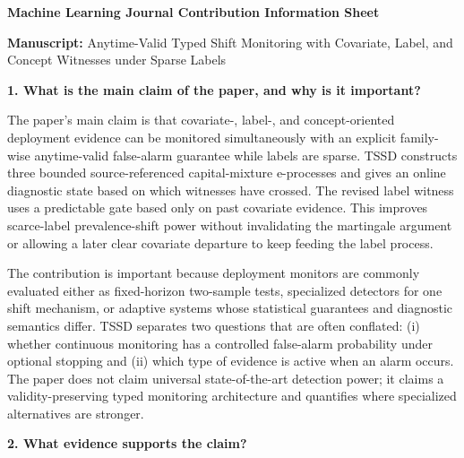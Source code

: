 \documentclass[11pt,a4paper]{article}
\begin{document}
\begin{center}
{\Large\bfseries Machine Learning Journal Contribution Information Sheet}\par
\vspace{0.35em}
{\bfseries Manuscript:} Anytime-Valid Typed Shift Monitoring with Covariate, Label, and Concept Witnesses under Sparse Labels
\end{center}

\textbf{1. What is the main claim of the paper, and why is it important?}

The paper's main claim is that covariate-, label-, and concept-oriented deployment evidence can be monitored simultaneously with an explicit family-wise anytime-valid false-alarm guarantee while labels are sparse. TSSD constructs three bounded source-referenced capital-mixture e-processes and gives an online diagnostic state based on which witnesses have crossed. The revised label witness uses a predictable gate based only on past covariate evidence. This improves scarce-label prevalence-shift power without invalidating the martingale argument or allowing a later clear covariate departure to keep feeding the label process.

The contribution is important because deployment monitors are commonly evaluated either as fixed-horizon two-sample tests, specialized detectors for one shift mechanism, or adaptive systems whose statistical guarantees and diagnostic semantics differ. TSSD separates two questions that are often conflated: (i) whether continuous monitoring has a controlled false-alarm probability under optional stopping and (ii) which type of evidence is active when an alarm occurs. The paper does not claim universal state-of-the-art detection power; it claims a validity-preserving typed monitoring architecture and quantifies where specialized alternatives are stronger.

\textbf{2. What evidence supports the claim?}
\end{document}
